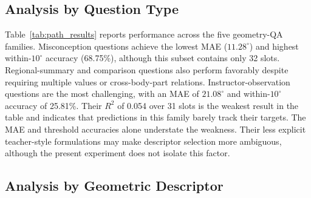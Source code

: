 \documentclass[conference]{IEEEtran}
\begin{document}
\subsection{Analysis by Question Type}
\label{sec:path_results}

Table~\ref{tab:path_results} reports performance across the five geometry-QA families.
Misconception questions achieve the lowest MAE ($11.28^\circ$) and highest within-$10^\circ$ accuracy (68.75\%), although this subset contains only 32 slots.
Regional-summary and comparison questions also perform favorably despite requiring multiple values or cross-body-part relations.
Instructor-observation questions are the most challenging, with an MAE of $21.08^\circ$ and within-$10^\circ$ accuracy of 25.81\%.
Their $R^2$ of 0.054 over 31 slots is the weakest result in the table and indicates that predictions in this family barely track their targets.
The MAE and threshold accuracies alone understate the weakness.
Their less explicit teacher-style formulations may make descriptor selection more ambiguous, although the present experiment does not isolate this factor.

\begin{table}[t]
    \centering
    \caption{Teacher-forced regression by geometry-QA type.}
    \label{tab:path_results}
\end{table}

\subsection{Analysis by Geometric Descriptor}
\label{sec:metric_results}
\end{document}
